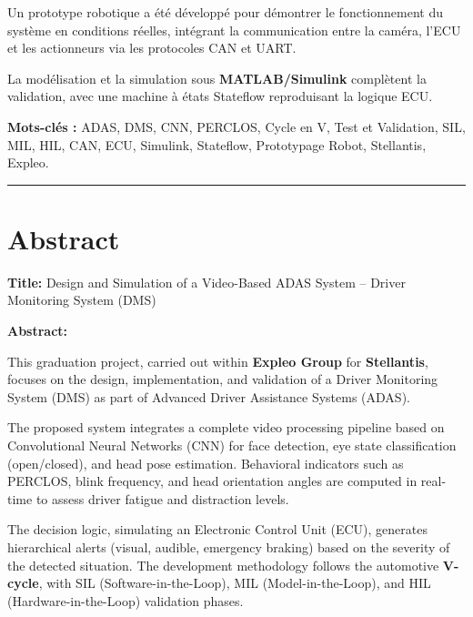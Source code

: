 \documentclass[12pt,a4paper,twoside]{report}
\begin{document}
Un prototype robotique a été développé pour démontrer le fonctionnement du système en conditions réelles, intégrant la communication entre la caméra, l'ECU et les actionneurs via les protocoles CAN et UART.

La modélisation et la simulation sous \textbf{MATLAB/Simulink} complètent la validation, avec une machine à états Stateflow reproduisant la logique ECU.

\vspace{0.5cm}

\noindent\textbf{Mots-clés :} ADAS, DMS, CNN, PERCLOS, Cycle en V, Test et Validation, SIL, MIL, HIL, CAN, ECU, Simulink, Stateflow, Prototypage Robot, Stellantis, Expleo.

\vspace{1.5cm}

\noindent\rule{\textwidth}{0.4pt}

\chapter*{Abstract}

\vspace{0.5cm}

\noindent\textbf{Title:} Design and Simulation of a Video-Based ADAS System -- Driver Monitoring System (DMS)

\vspace{0.5cm}

\noindent\textbf{Abstract:}

This graduation project, carried out within \textbf{Expleo Group} for \textbf{Stellantis}, focuses on the design, implementation, and validation of a Driver Monitoring System (DMS) as part of Advanced Driver Assistance Systems (ADAS).

The proposed system integrates a complete video processing pipeline based on Convolutional Neural Networks (CNN) for face detection, eye state classification (open/closed), and head pose estimation. Behavioral indicators such as PERCLOS, blink frequency, and head orientation angles are computed in real-time to assess driver fatigue and distraction levels.

The decision logic, simulating an Electronic Control Unit (ECU), generates hierarchical alerts (visual, audible, emergency braking) based on the severity of the detected situation. The development methodology follows the automotive \textbf{V-cycle}, with SIL (Software-in-the-Loop), MIL (Model-in-the-Loop), and HIL (Hardware-in-the-Loop) validation phases.
\end{document}
